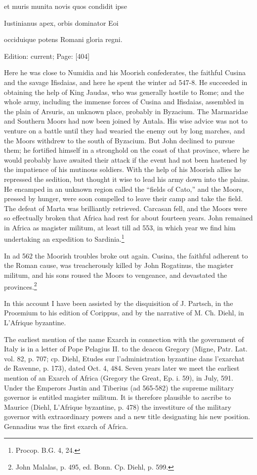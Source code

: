 et muris munita novis quos condidit ipse

Iustinianus apex, orbis dominator Eoi

occiduique potens Romani gloria regni.

Edition: current; Page: [404]

Here he was close to Numidia and his Moorish confederates, the faithful Cusina and the savage Ifisdaias, and here he spent the winter ad 547-8. He succeeded in obtaining the help of King Jaudas, who was generally hostile to Rome; and the whole army, including the immense forces of Cusina and Ifisdaias, assembled in the plain of Arsuris, an unknown place, probably in Byzacium. The Marmaridae and Southern Moors had now been joined by Antala. His wise advice was not to venture on a battle until they had wearied the enemy out by long marches, and the Moors withdrew to the south of Byzacium. But John declined to pursue them; he fortified himself in a stronghold on the coast of that province, where he would probably have awaited their attack if the event had not been hastened by the impatience of his mutinous soldiers. With the help of his Moorish allies he repressed the sedition, but thought it wise to lead his army down into the plains. He encamped in an unknown region called the \texthebrew{“}fields of Cato,\texthebrew{}” and the Moors, pressed by hunger, were soon compelled to leave their camp and take the field. The defeat of Marta was brilliantly retrieved. Carcasan fell, and the Moors were so effectually broken that Africa had rest for about fourteen years. John remained in Africa as magister militum, at least till ad 553, in which year we find him undertaking an expedition to Sardinia.\footnote{Procop. B.G. 4, 24.}

In ad 562 the Moorish troubles broke out again. Cusina, the faithful adherent to the Roman cause, was treacherously killed by John Rogatinus, the magister militum, and his sons roused the Moors to vengeance, and devastated the provinces.\footnote{John Malalas, p. 495, ed. Bonn. Cp. Diehl, p. 599.}

In this account I have been assisted by the disquisition of J. Partsch, in the Proœmium to his edition of Corippus, and by the narrative of M. Ch. Diehl, in L\texthebrew{}’Afrique byzantine.


The earliest mention of the name Exarch in connection with the government of Italy is in a letter of Pope Pelagius II. to the deacon Gregory (Migne, Patr. Lat. vol. 82, p. 707; cp. Diehl, Etudes sur l\texthebrew{}’administration byzantine dans l\texthebrew{}’exarchat de Ravenne, p. 173), dated Oct. 4, 484. Seven years later we meet the earliest mention of an Exarch of Africa (Gregory the Great, Ep. i. 59), in July, 591. Under the Emperors Justin and Tiberius (ad 565-582) the supreme military governor is entitled magister militum. It is therefore plausible to ascribe to Maurice (Diehl, L\texthebrew{}’Afrique byzantine, p. 478) the investiture of the military governor with extraordinary powers and a new title designating his new position. Gennadius was the first exarch of Africa.

